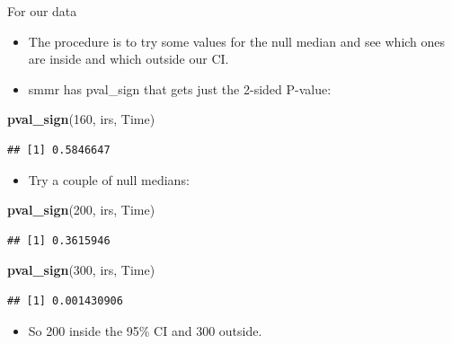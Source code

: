 \documentclass[ignorenonframetext,]{beamer}
\newenvironment{Shaded}{\begin{snugshade}}{\end{snugshade}}
\newcommand{\DecValTok}[1]{\textcolor[rgb]{0.00,0.00,0.81}{#1}}
\newcommand{\KeywordTok}[1]{\textcolor[rgb]{0.13,0.29,0.53}{\textbf{#1}}}
\newcommand{\NormalTok}[1]{#1}
\providecommand{\tightlist}{%
  \setlength{\itemsep}{0pt}\setlength{\parskip}{0pt}}
\begin{document}
\begin{frame}[fragile]{For our data}
\protect\hypertarget{for-our-data}{}

\begin{itemize}
\tightlist
\item
  The procedure is to try some values for the null median and see which
  ones are inside and which outside our CI.
\item
  smmr has pval\_sign that gets just the 2-sided P-value:
\end{itemize}

\begin{Shaded}
\begin{Highlighting}[]
\KeywordTok{pval_sign}\NormalTok{(}\DecValTok{160}\NormalTok{, irs, Time)}
\end{Highlighting}
\end{Shaded}

\begin{verbatim}
## [1] 0.5846647
\end{verbatim}

\begin{itemize}
\tightlist
\item
  Try a couple of null medians:
\end{itemize}

\begin{Shaded}
\begin{Highlighting}[]
\KeywordTok{pval_sign}\NormalTok{(}\DecValTok{200}\NormalTok{, irs, Time)}
\end{Highlighting}
\end{Shaded}

\begin{verbatim}
## [1] 0.3615946
\end{verbatim}

\begin{Shaded}
\begin{Highlighting}[]
\KeywordTok{pval_sign}\NormalTok{(}\DecValTok{300}\NormalTok{, irs, Time)}
\end{Highlighting}
\end{Shaded}

\begin{verbatim}
## [1] 0.001430906
\end{verbatim}

\begin{itemize}
\tightlist
\item
  So 200 inside the 95\% CI and 300 outside.
\end{itemize}

\end{frame}
\end{document}
